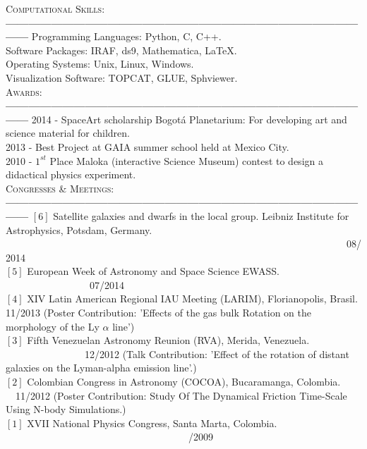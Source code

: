 \documentclass[letterpaper]{article}
\begin{document}
\textsc{\Large Computational Skills}:\\
{\bf---------------------------------------------------------------------------------------------------}
Programming Languages: Python, C, C++.\\
Software Packages: IRAF, ds9, Mathematica, \LaTeX.\\
Operating Systems: Unix, Linux, Windows.\\
Visualization Software: TOPCAT, GLUE, Sphviewer.\\

\textsc{\Large Awards:}\\
{\bf---------------------------------------------------------------------------------------------------}
2014 - SpaceArt scholarship Bogot\'a Planetarium: For developing art and science material for children. \\
2013 - Best Project at GAIA summer school held at Mexico City.\\
2010 - $1^{st}$ Place Maloka (interactive Science Museum) contest to design a didactical physics experiment.\\ 

\textsc{\Large Congresses \& Meetings:}\\
{\bf---------------------------------------------------------------------------------------------------}
$\left[6\right]$ Satellite galaxies and dwarfs in the local group. Leibniz Institute for Astrophysics, Potsdam, Germany. \indent \indent \ \ \ \ \ \
\ \ \ \ \ \ \ \ \ \ \ \ \ \ \ \ \ \ \ \ \ \ \ \ \ \ \ \ \ \ \ \ \ \ \ \ \ \ \ \ \ \ \ \ \ \ \ \ \ \ \ \ \ \ \ \ \ \ \ \ \ \ \ 08/2014  \\
$\left[5\right]$ European Week of Astronomy and Space Science EWASS.  \indent \ \ \ \ \ \ \ \ \ \ \ \ \ \ \ \ \ 07/2014 \\
$\left[4\right]$ XIV Latin American Regional IAU Meeting (LARIM), Florianopolis, Brasil.  11/2013
\normalsize {(Poster Contribution: 'Effects of the gas bulk Rotation on the morphology of the Ly $\alpha$ line')}\\
$\left[3\right]$\large{ Fifth Venezuelan Astronomy Reunion (RVA), Merida, Venezuela. \indent \ \ \ \  \ \ \ \ \ \ \ \ \ \ \ \ 12/2012}
\normalsize{(Talk Contribution: 'Effect of the rotation of distant galaxies on the Lyman-alpha emission line'.)}\\
$\left[2\right]$\large{ Colombian Congress in Astronomy (COCOA), Bucaramanga, Colombia. \indent \ \ 11/2012} 
\normalsize{(Poster Contribution: Study Of The Dynamical Friction Time-Scale Using N-body Simulations.)}\\
$\left[1\right]$\large{ XVII National Physics Congress, Santa Marta, Colombia. \indent \ \ \ \ \ \ \ \ \ \ \ \ \ \ \ \ \  \ \ \ \ \ \ \ \ \ \ \ \ \ \ \ \ \ \ \ \   /2009}\\
\end{document}
